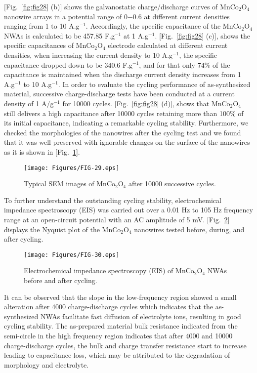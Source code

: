 \documentclass[reprint,amsmath,amssymb,aps,floatfix,
]{revtex4-2}
\begin{document}
[Fig.~\ref{fig:fig28} (b)] shows the galvanostatic charge/discharge curves of MnCo$_2$O$_4$ nanowire arrays in a potential range of 0$-$0.6 at different current densities ranging from 1 to 10 A.g$^{-1}$. Accordingly, the specific capacitance of the MnCo$_2$O$_4$ NWAs is calculated to be 457.85 F.g$^{-1}$ at 1 A.g$^{-1}$. [Fig.~\ref{fig:fig28} (c)], shows the specific capacitances of MnCo$_2$O$_4$ electrode calculated at different current densities, when increasing the current density to 10 A.g$^{-1}$, the specific capacitance dropped down to be 340.6 F.g$^{-1}$, and for that only 74\% of the capacitance is maintained when the discharge current density increases from 1 A.g$^{-1}$ to 10 A.g$^{-1}$. In order to evaluate the cycling performance of as-synthesized material, successive charge-discharge tests have been conducted at a current density of 1 A/g$^{-1}$ for 10000 cycles. [Fig.~\ref{fig:fig28} (d)], shows that MnCo$_2$O$_4$ still delivers a high capacitance after 10000 cycles retaining more than 100\% of its initial capacitance, indicating a remarkable cycling stability. Furthermore, we checked the morphologies of the nanowires after the cycling test and we found that it was well preserved with ignorable changes on the surface of the nanowires as it is shown in [Fig.~\ref{fig:fig29}].
\begin{figure}[t]
    \centering
    \texttt{[image: Figures/FIG-29.eps]}
    \caption{\label{fig:fig29}Typical SEM images of MnCo$_2$O$_4$ after 10000 successive cycles.}
    \end{figure}
To further understand the outstanding cycling stability, electrochemical impedance spectroscopy (EIS) was carried out over a 0.01 Hz to 105 Hz frequency range at an open-circuit potential with an AC amplitude of 5 mV. [Fig.~\ref{fig:fig30}] displays the Nyquist plot of the MnCo$_2$O$_4$ nanowires tested before, during, and after cycling.
\begin{figure}[t]
    \centering
    \texttt{[image: Figures/FIG-30.eps]}
    \caption{\label{fig:fig30}Electrochemical impedance spectroscopy (EIS) of MnCo$_2$O$_4$ NWAs before and after cycling.}
    \end{figure}
It can be observed that the slope in the low-frequency region showed a small alteration after 4000 charge-discharge cycles which indicates that the as-synthesized NWAs facilitate fast diffusion of electrolyte ions, resulting in good cycling stability. The as-prepared material bulk resistance indicated from the semi-circle in the high frequency region indicates that after 4000 and 10000 charge-discharge cycles, the bulk and charge transfer resistance start to increase leading to capacitance loss, which may be attributed to the degradation of morphology and electrolyte.
\end{document}
